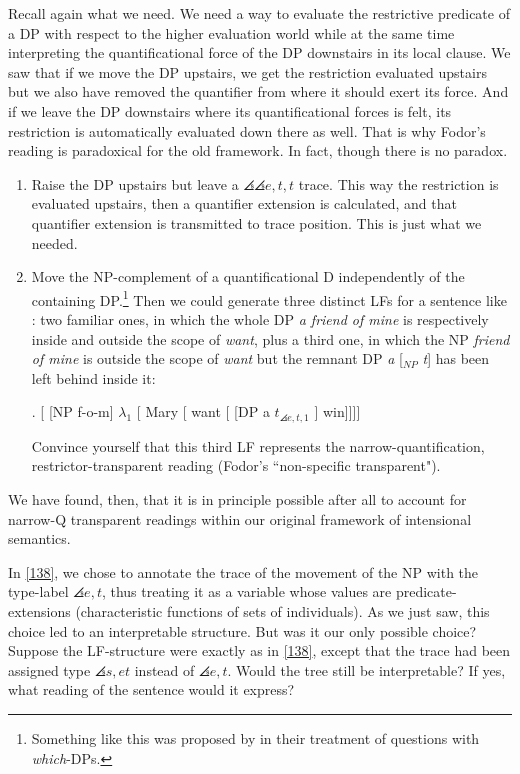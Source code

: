 Recall again what we need. We need a way to evaluate the restrictive predicate of a DP with respect to the higher evaluation world while at the same time interpreting the quantificational force of the DP downstairs in its local clause. We saw that if we move the DP upstairs, we get the restriction evaluated upstairs but we also have removed the quantifier from where it should exert its force. And if we leave the DP downstairs where its quantificational forces is felt, its restriction is automatically evaluated down there as well. That is why Fodor's reading is paradoxical for the old framework. In fact, though there is no paradox.

\begin{enumerate}[{Way} 1]
  
  \item Raise the DP upstairs but leave a $\angles{\angles{e,t},t}$ trace. This way the restriction is evaluated upstairs, then a quantifier extension is calculated, and that quantifier extension is transmitted to trace position. This is just what we needed.
  
  \item Move the NP-complement of a quantificational D independently of the containing DP.\footnote{Something like this was proposed by \citet{groenendijk-stokhof:L&P:82} in their treatment of questions with \emph{which}-DPs.} Then we could generate three distinct LFs for a sentence like : two familiar ones, in which the whole DP \emph{a friend of mine} is respectively inside and outside the scope of \emph{want}, plus a third one, in which the NP \emph{friend of mine} is outside the scope of \emph{want} but the remnant DP \emph{a} [$_{NP}$ \emph{t}] has been left behind inside it:
  
  \exi. \label{138} [ [NP f-o-m] $\lambda_1$ [ Mary [ want [ [DP a $t_{\angles{e,t},1}$ ] win]]]]
  
  \begin{exercise}
      Convince yourself that this third LF represents the narrow-quantification, restrictor-transparent reading (Fodor's ``non-specific transparent"). \eex 
  \end{exercise}
\end{enumerate}
%
We have found, then, that it is in principle possible after all to account for narrow-Q transparent readings within our original framework of intensional semantics.

\begin{exercise}
  In \ref{138}, we chose to annotate the trace of the movement of the NP with the type-label $\angles{e,t}$, thus treating it as a variable whose values are predicate-extensions (characteristic functions of sets of individuals). As we just saw, this choice led to an interpretable structure. But was it our only possible choice? Suppose the LF-structure were exactly as in \ref{138}, except that the trace had been assigned type $\angles{s,et}$ instead of $\angles{e,t}$. Would the tree still be interpretable? If yes, what reading of the sentence would it express? \eex 
\end{exercise}

